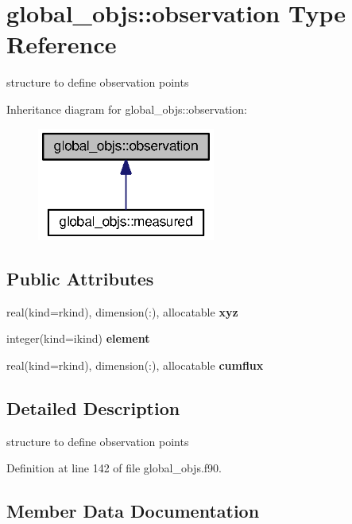 \section{global\+\_\+objs\+:\+:observation Type Reference}
\label{structglobal__objs_1_1observation}


structure to define observation points  




Inheritance diagram for global\+\_\+objs\+:\+:observation\+:\nopagebreak
\begin{figure}[H]
\begin{center}
\leavevmode
\includegraphics[width=166pt]{structglobal__objs_1_1observation__inherit__graph}
\end{center}
\end{figure}
\subsection*{Public Attributes}
\begin{DoxyCompactItemize}
\item 
real(kind=rkind), dimension(\+:), allocatable {\bf xyz}
\item 
integer(kind=ikind) {\bf element}
\item 
real(kind=rkind), dimension(\+:), allocatable {\bf cumflux}
\end{DoxyCompactItemize}


\subsection{Detailed Description}
structure to define observation points 

Definition at line 142 of file global\+\_\+objs.\+f90.



\subsection{Member Data Documentation}
